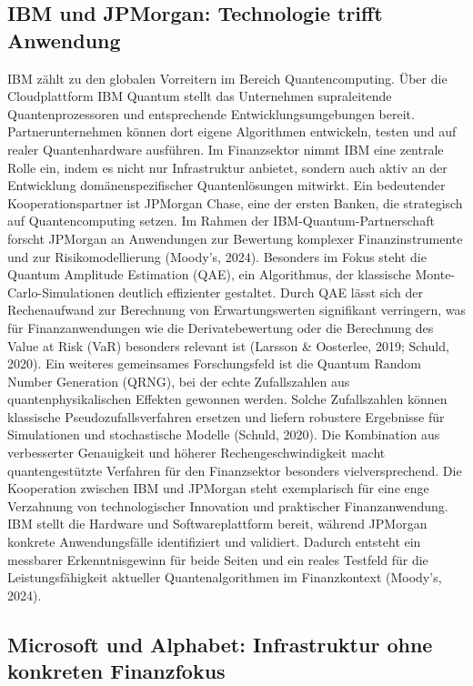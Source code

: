 \subsection{IBM und JPMorgan: Technologie trifft Anwendung}

IBM zählt zu den globalen Vorreitern im Bereich Quantencomputing. Über die Cloudplattform IBM Quantum stellt das Unternehmen supraleitende Quantenprozessoren und entsprechende Entwicklungsumgebungen bereit. Partnerunternehmen können dort eigene Algorithmen entwickeln, testen und auf realer Quantenhardware ausführen. Im Finanzsektor nimmt IBM eine zentrale Rolle ein, indem es nicht nur Infrastruktur anbietet, sondern auch aktiv an der Entwicklung domänenspezifischer Quantenlösungen mitwirkt.
Ein bedeutender Kooperationspartner ist JPMorgan Chase, eine der ersten Banken, die strategisch auf Quantencomputing setzen. Im Rahmen der IBM-Quantum-Partnerschaft forscht JPMorgan an Anwendungen zur Bewertung komplexer Finanzinstrumente und zur Risikomodellierung (Moody’s, 2024). Besonders im Fokus steht die Quantum Amplitude Estimation (QAE), ein Algorithmus, der klassische Monte-Carlo-Simulationen deutlich effizienter gestaltet. Durch QAE lässt sich der Rechenaufwand zur Berechnung von Erwartungswerten signifikant verringern, was für Finanzanwendungen wie die Derivatebewertung oder die Berechnung des Value at Risk (VaR) besonders relevant ist (Larsson & Oosterlee, 2019; Schuld, 2020).
Ein weiteres gemeinsames Forschungsfeld ist die Quantum Random Number Generation (QRNG), bei der echte Zufallszahlen aus quantenphysikalischen Effekten gewonnen werden. Solche Zufallszahlen können klassische Pseudozufallsverfahren ersetzen und liefern robustere Ergebnisse für Simulationen und stochastische Modelle (Schuld, 2020). Die Kombination aus verbesserter Genauigkeit und höherer Rechengeschwindigkeit macht quantengestützte Verfahren für den Finanzsektor besonders vielversprechend.
Die Kooperation zwischen IBM und JPMorgan steht exemplarisch für eine enge Verzahnung von technologischer Innovation und praktischer Finanzanwendung. IBM stellt die Hardware und Softwareplattform bereit, während JPMorgan konkrete Anwendungsfälle identifiziert und validiert. Dadurch entsteht ein messbarer Erkenntnisgewinn für beide Seiten und ein reales Testfeld für die Leistungsfähigkeit aktueller Quantenalgorithmen im Finanzkontext (Moody’s, 2024).

\subsection{Microsoft und Alphabet: Infrastruktur ohne konkreten Finanzfokus}

